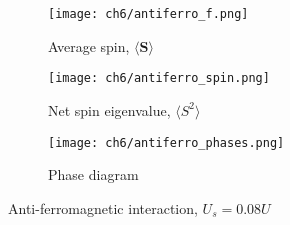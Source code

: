 \begin{figure}[!htb]
    \centering
    \begin{subfigure}[b]{0.49\textwidth}  %
        \centering
        \texttt{[image: ch6/antiferro\_f.png]}
        \caption{Average spin, $\langle \mathbf{S} \rangle$}
    \end{subfigure}
    \hspace{1em}  %
    \begin{subfigure}[b]{0.45\textwidth}
        \centering
        \texttt{[image: ch6/antiferro\_spin.png]}
        \caption{Net spin eigenvalue, $\langle S^2 \rangle$}
    \end{subfigure}
    \hspace{1em}
    \vspace{0.5cm}  %
    \centering
    \begin{subfigure}[b]{0.75\textwidth}  %
        \centering
        \texttt{[image: ch6/antiferro\_phases.png]}
        \caption{Phase diagram}
    \end{subfigure}
    \caption{Anti-ferromagnetic interaction, $U_s = 0.08U$}
    \label{fig:antiferro}
\end{figure}
